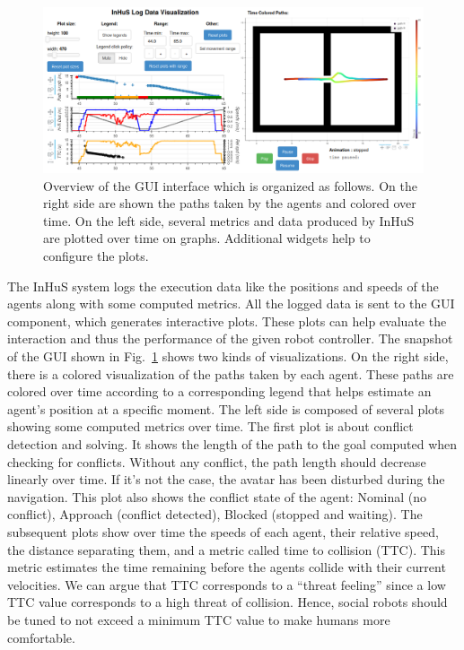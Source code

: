 \begin{figure}[!b]
    \centering
    \includegraphics[width=0.8\linewidth]{images/Chapter6/gui_bis_bis.png}
    \caption{
    Overview of the GUI interface which is organized as follows. On the right side are shown the paths taken by the agents and colored over time. On the left side, several metrics and data produced by InHuS are plotted over time on graphs. Additional widgets help to configure the plots. 
    }
    \label{fig:gui}
\end{figure}

The InHuS system logs the execution data like the positions and speeds of the agents along with some computed metrics. All the logged data is sent to the GUI component, which generates interactive plots. These plots can help evaluate the interaction and thus the performance of the given robot controller. The snapshot of the GUI shown in Fig.~\ref{fig:gui} shows two kinds of visualizations. On the right side, there is a colored visualization of the paths taken by each agent. These paths are colored over time according to a corresponding legend that helps estimate an agent's position at a specific moment. The left side is composed of several plots showing some computed metrics over time. The first plot is about conflict detection and solving. It shows the length of the path to the goal computed when checking for conflicts. Without any conflict, the path length should decrease linearly over time. If it's not the case, the avatar has been disturbed during the navigation. This plot also shows the conflict state of the agent: Nominal (no conflict), Approach (conflict detected), Blocked (stopped and waiting). The subsequent plots show over time the speeds of each agent, their relative speed, the distance separating them, 
and a metric called time to collision (TTC). This metric estimates the time remaining before the agents collide with their current velocities. We can argue that TTC corresponds to a ``threat feeling'' since a low TTC value corresponds to a high threat of collision. Hence, social robots should be tuned to not exceed a minimum TTC value to make humans more comfortable.

